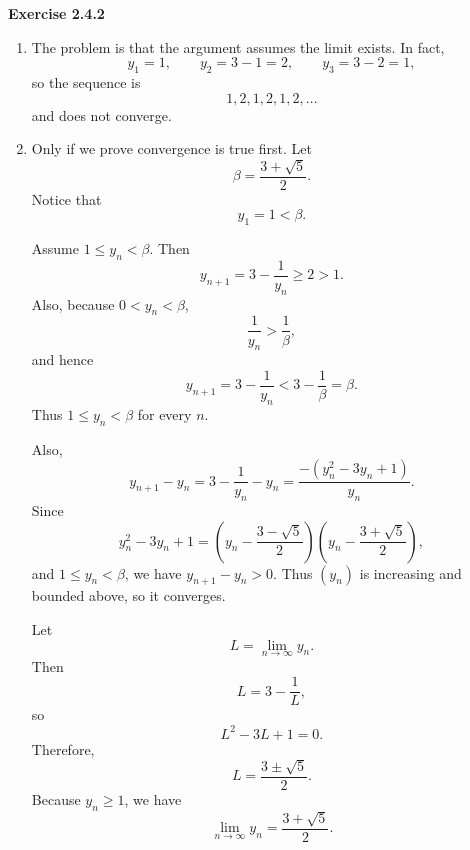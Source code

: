 \documentclass[12pt]{article}
\begin{document}
\noindent{} \textbf{Exercise 2.4.2}
\begin{enumerate}
    \item [(a)] The problem is that the argument assumes the limit exists.
          In fact,
          \[
              y_1=1,\qquad y_2=3-1=2,\qquad y_3=3-2=1,
          \]so the sequence is
          \[
              1,2,1,2,1,2,\ldots
          \]and does not converge.
    \item [(b)] Only if we prove convergence is true first.
          Let
          \[
              \beta=\frac{3+\sqrt5}{2}.
          \]
          Notice that
          \[
              y_1=1<\beta.
          \]

          Assume \(1\le y_n<\beta\). Then
          \[
              y_{n+1}=3-\frac1{y_n}\ge 2>1.
          \]
          Also, because \(0<y_n<\beta\),
          \[
              \frac1{y_n}>\frac1\beta,
          \]
          and hence
          \[
              y_{n+1}
              =3-\frac1{y_n}
              <3-\frac1\beta
              =\beta.
          \]
          Thus \(1\le y_n<\beta\) for every \(n\).

          Also,
          \[
              y_{n+1}-y_n
              =
              3-\frac1{y_n}-y_n
              =
              \frac{-(y_n^2-3y_n+1)}{y_n}.
          \]
          Since
          \[
              y_n^2-3y_n+1
              =
              \left(y_n-\frac{3-\sqrt5}{2}\right)
              \left(y_n-\frac{3+\sqrt5}{2}\right),
          \]
          and \(1\le y_n<\beta\), we have \(y_{n+1}-y_n>0\).
          Thus \((y_n)\) is increasing and bounded above, so it converges.

          Let
          \[
              L=\lim_{n\to\infty}y_n.
          \]
          Then
          \[
              L=3-\frac1L,
          \]
          so
          \[
              L^2-3L+1=0.
          \]
          Therefore,
          \[
              L=\frac{3\pm\sqrt5}{2}.
          \]
          Because \(y_n\ge1\), we have
          \[
              \lim_{n\to\infty}y_n=\frac{3+\sqrt5}{2}.
          \]
\end{enumerate}
\end{document}
